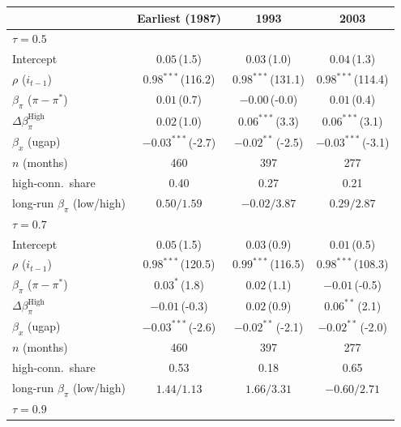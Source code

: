 \setlength{\tabcolsep}{4pt}\scriptsize
\begin{tabular}{lccc}
\toprule
 & Earliest (1987) & 1993 & 2003 \\
\midrule
\multicolumn{4}{l}{\textit{$\tau=0.5$}} \\
Intercept & $0.05$\,{\scriptsize(1.5)} & $0.03$\,{\scriptsize(1.0)} & $0.04$\,{\scriptsize(1.3)} \\
$\rho$ ($i_{t-1}$) & $0.98^{***}$\,{\scriptsize(116.2)} & $0.98^{***}$\,{\scriptsize(131.1)} & $0.98^{***}$\,{\scriptsize(114.4)} \\
$\beta_\pi$ ($\pi-\pi^*$) & $0.01$\,{\scriptsize(0.7)} & $-0.00$\,{\scriptsize(-0.0)} & $0.01$\,{\scriptsize(0.4)} \\
$\Delta\beta_\pi^{\text{High}}$ & $0.02$\,{\scriptsize(1.0)} & $0.06^{***}$\,{\scriptsize(3.3)} & $0.06^{***}$\,{\scriptsize(3.1)} \\
$\beta_x$ (ugap) & $-0.03^{***}$\,{\scriptsize(-2.7)} & $-0.02^{**}$\,{\scriptsize(-2.5)} & $-0.03^{***}$\,{\scriptsize(-3.1)} \\
\addlinespace
$n$ (months) & 460 & 397 & 277 \\
high-conn.\ share & 0.40 & 0.27 & 0.21 \\
long-run $\beta_\pi$ (low/high) & $0.50/1.59$ & $-0.02/3.87$ & $0.29/2.87$ \\
\midrule
\multicolumn{4}{l}{\textit{$\tau=0.7$}} \\
Intercept & $0.05$\,{\scriptsize(1.5)} & $0.03$\,{\scriptsize(0.9)} & $0.01$\,{\scriptsize(0.5)} \\
$\rho$ ($i_{t-1}$) & $0.98^{***}$\,{\scriptsize(120.5)} & $0.99^{***}$\,{\scriptsize(116.5)} & $0.98^{***}$\,{\scriptsize(108.3)} \\
$\beta_\pi$ ($\pi-\pi^*$) & $0.03^{*}$\,{\scriptsize(1.8)} & $0.02$\,{\scriptsize(1.1)} & $-0.01$\,{\scriptsize(-0.5)} \\
$\Delta\beta_\pi^{\text{High}}$ & $-0.01$\,{\scriptsize(-0.3)} & $0.02$\,{\scriptsize(0.9)} & $0.06^{**}$\,{\scriptsize(2.1)} \\
$\beta_x$ (ugap) & $-0.03^{***}$\,{\scriptsize(-2.6)} & $-0.02^{**}$\,{\scriptsize(-2.1)} & $-0.02^{**}$\,{\scriptsize(-2.0)} \\
\addlinespace
$n$ (months) & 460 & 397 & 277 \\
high-conn.\ share & 0.53 & 0.18 & 0.65 \\
long-run $\beta_\pi$ (low/high) & $1.44/1.13$ & $1.66/3.31$ & $-0.60/2.71$ \\
\midrule
\multicolumn{4}{l}{\textit{$\tau=0.9$}} \\

\end{tabular}
